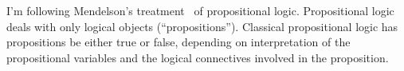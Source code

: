 \begin{node}\label{prop-0000}%
I'm following Mendelson's treatment~\cite{mendelson2015mathematical} of
propositional logic. Propositional logic deals with only logical objects
(``propositions''). Classical propositional logic has propositions be
either true or false, depending on interpretation of the propositional
variables and the logical connectives involved in the proposition.
\end{node}
